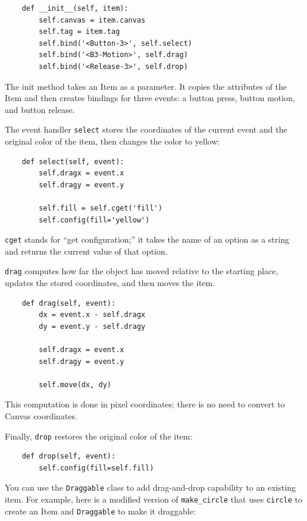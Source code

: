\documentclass[10pt]{book}
\begin{document}
{\begin{verbatim}
    def __init__(self, item):
        self.canvas = item.canvas
        self.tag = item.tag
        self.bind('<Button-3>', self.select)
        self.bind('<B3-Motion>', self.drag)
        self.bind('<Release-3>', self.drop)
\end{verbatim}
\afterverb
%
The init method takes an Item as a parameter.  It copies
the attributes of the Item and then creates bindings for
three events: a button press, button motion, and button release.

The event handler {\tt select} stores the coordinates
of the current event and the original color of the item, then
changes the color to yellow:

\beforeverb
\begin{verbatim}
    def select(self, event):
        self.dragx = event.x
        self.dragy = event.y

        self.fill = self.cget('fill')
        self.config(fill='yellow')
\end{verbatim}
\afterverb
%
{\tt cget} stands for ``get configuration;'' it takes the name of an
option as a string and returns the current value of that option.

{\tt drag} computes how far the object has moved relative to the
starting place, updates the stored coordinates, and then moves the
item.


\beforeverb
\begin{verbatim}
    def drag(self, event):
        dx = event.x - self.dragx
        dy = event.y - self.dragy

        self.dragx = event.x
        self.dragy = event.y

        self.move(dx, dy)
\end{verbatim}
\afterverb
%
This computation is done in pixel coordinates; there is no need to
convert to Canvas coordinates.


Finally, {\tt drop} restores the original color of the item:

\beforeverb
\begin{verbatim}
    def drop(self, event):
        self.config(fill=self.fill)
\end{verbatim}
\afterverb
%
You can use the {\tt Draggable} class to add drag-and-drop
capability to an existing item.  For example, here is a modified
version of \verb"make_circle" that uses {\tt circle} to create
an Item and {\tt Draggable} to make it draggable:

}
\end{document}
